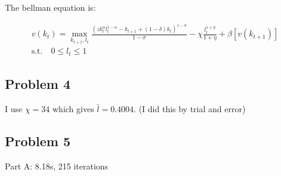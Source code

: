 \documentclass{article}
\begin{document}
The bellman equation is: 

\begin{gather*}
    v(k_t) = \max_{k_{t+1}, l_t} \frac{\left( z k_t^\alpha l_t^{1-\alpha} - k_{t+1} + (1-\delta)k_t \right)^{1-\sigma}}{1-\sigma} -\chi \frac{l_t^{1+\eta}}{1+\eta} + \beta [v(k_{t+1})] \\
    \text{s.t.} \quad 0 \leq l_t \leq 1 
\end{gather*}

\subsection*{Problem 4}
I use $\chi = 34$ which gives $\bar{l} = 0.4004$. (I did this by trial and error)

\subsection*{Problem 5}
Part A: 8.18s, 215 iterations \\
\end{document}
